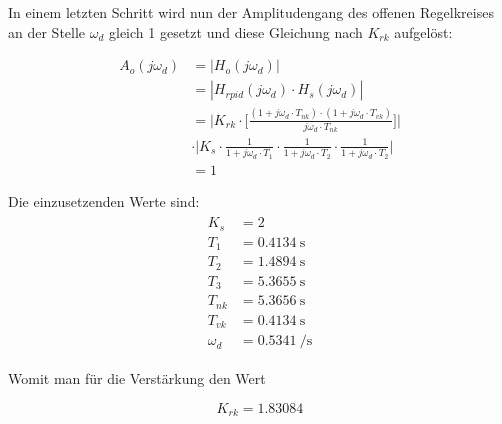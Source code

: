 In einem letzten Schritt wird  nun der Amplitudengang des offenen Regelkreises
an der  Stelle $\omega_d$ gleich 1  gesetzt und diese Gleichung  nach $K_{rk}$
aufgel\"ost:

\begin{equation} \label{eq:pid:h_o_k_rk_one}
    \begin{split}
        A_{o}(j\omega_d)    & = | H_{o}(j\omega_d) |                            \\
                            & = | H_{rpid}(j\omega_d) \cdot H_s(j\omega_d) |    \\
                            & = \Biggl \rvert
                                    K_{rk}
                                    \cdot
                                    \biggl[ \frac{(1 + j\omega_d \cdot T_{nk}) \cdot (1 + j\omega_d \cdot T_{vk}) }{ j\omega_d \cdot T_{nk} } \biggr] \Biggr \rvert \\
                            & \cdot
                                \Biggl \rvert
                                    K_s
                                    \cdot \frac{1}{1 + j\omega_d \cdot T_1}
                                    \cdot \frac{1}{1 + j\omega_d \cdot T_2}
                                    \cdot \frac{1}{1 + j\omega_d \cdot T_2}
                                    \Biggr \rvert \\
                            & = 1
    \end{split}
\end{equation}

Die einzusetzenden Werte sind:
\begin{gather} \label{eq:pid:h_o_k_rk_one}
    \begin{split}
        K_s         & = 2                        \\
        T_1         & = \SI{0.4134}{\second}     \\
        T_2         & = \SI{1.4894}{\second}     \\
        T_3         & = \SI{5.3655}{\second}     \\
        T_{nk}      & = \SI{5.3656}{\second}     \\
        T_{vk}      & = \SI{0.4134}{\second}     \\
        \omega_d    & = \SI{0.5341}{\per\second}
    \end{split}
\end{gather}

Womit man f\"ur die Verst\"arkung den Wert

\begin{equation} \label{eq:pid:k_rk_result}
    K_{rk} = 1.83084
\end{equation}

